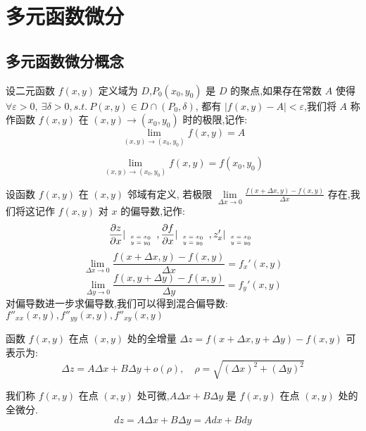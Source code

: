 \chapter{多元函数微分}
\section{多元函数微分概念}
\begin{definition}[多元函数极限]
	
	设二元函数 $f(x,y)$ 定义域为 $D$,$P_{0}(x_{0},y_{0})$ 是 $D$ 的聚点,如果存在常数 $A$ 使得 $\forall \varepsilon >0,\ \exists \delta>0,s.t. \ P(x,y)\in D\cap(P_{0},\delta)$, 都有 $|f(x,y)-A|<\varepsilon $,我们将 $A$ 称作函数 $f(x,y)$ 在 $(x,y)\rightarrow (x_{0},y_{0})$ 时的极限,记作: 
	$$\lim\limits_{(x,y)\rightarrow (x_{0},y_{0})}f(x,y)=A$$
\end{definition}
\begin{definition}[连续]\label{def: 多元微分学概念: 连续、偏导、可微}
	$$\lim\limits_{(x,y)\rightarrow (x_{0},y_{0})}f(x,y)=f(x_{0},y_{0})$$
\end{definition}
\begin{definition}[偏导数]
	
	设函数 $f(x,y)$ 在 $(x,y)$ 邻域有定义, 若极限 $\lim\limits_{\Delta x\rightarrow 0}\frac{f(x+\Delta x,y)-f(x,y)}{\Delta x}$ 存在,我们将这记作 $f(x,y)$ 对 $x$ 的偏导数,记作: 
	$$\frac{\partial z}{\partial x}|_{\mbox{\tiny$\begin{array}{c} 
				x=x_{0}\\ 
				y=y_{0}\\ 
			\end{array}$}},\frac{\partial f}{\partial x}|_{\mbox{\tiny$\begin{array}{c} 
				x=x_{0}\\ 
				y=y_{0}\\ 
			\end{array}$}},z_{x}'|_{\mbox{\tiny$\begin{array}{c} 
				x=x_{0}\\ 
				y=y_{0}\\ 
			\end{array}$}}$$
	$$\lim\limits_{\Delta x\rightarrow 0}\frac{f(x+\Delta x,y)-f(x,y)}{\Delta x}=f_{x}'(x,y)$$
	$$\lim\limits_{\Delta y\rightarrow 0}\frac{f(x,y+\Delta y)-f(x,y)}{\Delta y}=f_{y}'(x,y)$$
	对偏导数进一步求偏导数,我们可以得到混合偏导数: $f''_{xx}(x,y),f''_{yy}(x,y),f''_{xy}(x,y)$
\end{definition}
\begin{definition}[可微]
	
	函数 $f(x,y)$ 在点 $(x,y)$ 处的全增量 $\Delta z=f(x+\Delta x,y+\Delta y)-f(x,y)$ 可表示为: 
	$$\Delta z=A\Delta x+B\Delta y+o(\rho),\quad \rho=\sqrt{(\Delta x)^2+(\Delta y)^2}$$
	
	我们称 $f(x,y)$ 在点 $(x,y)$ 处可微,$A\Delta x+B\Delta y$ 是 $f(x,y)$ 在点 $(x,y)$ 处的全微分.
	$$dz=A\Delta x+B\Delta y=Adx+Bdy$$
\end{definition}
